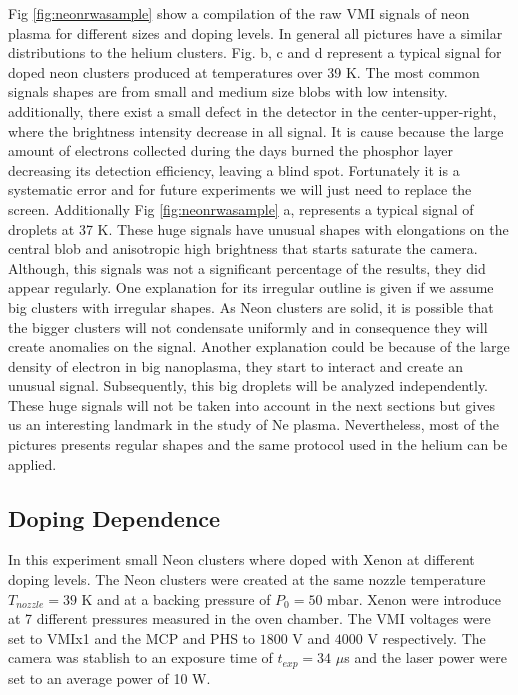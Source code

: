 Fig \ref{fig:neonrwasample} show a compilation of the raw VMI signals of neon plasma for different sizes and doping levels. In general all pictures have a similar distributions to the helium clusters. Fig. b, c and d represent a typical signal for doped neon clusters produced at temperatures over 39 K. The most common signals shapes are from small and medium size blobs with low intensity. additionally, there exist a small defect in the detector in the center-upper-right, where the brightness intensity decrease in all signal. It is cause because the large amount of electrons collected during the days burned the phosphor layer decreasing its detection efficiency, leaving a blind spot. Fortunately it is a systematic error and for future experiments we will just need to replace the screen. Additionally Fig  \ref{fig:neonrwasample} a, represents a typical signal of droplets at 37 K. These huge signals have  unusual shapes with elongations on the central blob and anisotropic high brightness that starts saturate the camera. Although, this signals was not a significant percentage of the results, they did appear regularly. One explanation for its irregular outline is given if we assume big clusters with irregular shapes. As Neon clusters are solid, it is possible that the bigger clusters will not condensate uniformly and in consequence they will create anomalies on the signal. Another explanation could be because of the large density of electron in big nanoplasma, they start to interact and create an unusual signal. Subsequently, this big droplets will be analyzed independently. These huge signals will not be taken into account in the next sections but gives us an interesting landmark in the study of Ne plasma. Nevertheless, most of the pictures presents regular shapes and the same protocol used in the helium can be applied. 


\subsection{Doping Dependence }

In this experiment small Neon clusters where doped with Xenon at different doping levels. The Neon clusters were created at the same nozzle temperature $T_{nozzle}=39$ K and at a backing pressure of $P_{0}=50$ mbar. Xenon were introduce at 7 different pressures measured in the oven chamber. The VMI voltages were set to VMIx1 and the MCP and PHS to $1800$ V and $4000$ V respectively. The camera was stablish to an exposure time of $t_{exp}=34$ $\mu$s  and the laser power were set to an average power of 10 W.


